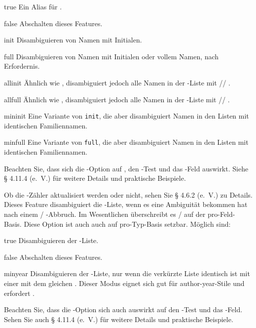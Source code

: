 \documentclass{ltxdockit}[2011/03/25]
\begin{document}
\begin{optionlist}
\begin{valuelist} 
\item[true] Ein Alias für .  
\item[false] Abschalten dieses Features.  
\item[init] Disambiguieren von Namen mit Initialen.  
\item[full] Disambiguieren von Namen mit Initialen oder vollem Namen, nach
Erfordernis.  
\item[allinit] Ähnlich wie , disambiguiert jedoch alle Namen in
der -Liste mit \slash {}\slash 
{}.
\item[allfull] Ähnlich wie , disambiguiert jedoch alle Namen in
der -Liste mit \slash {}\slash
{}.  
\item[mininit] Eine Variante von \texttt{init}, die aber disambiguiert
Namen in den Listen mit identischen Familiennamen. 
\item[minfull] Eine Variante von \texttt{full}, die aber disambiguiert
Namen in den Listen mit identischen Familiennamen.  
\end{valuelist}
%
Beachten Sie, dass sich die -Option auf
, den -Test und das
-Feld auswirkt. Siehe § 4.11.4 (e.~V.) %
für weitere Details und praktische Beispiele.



Ob die -Zähler aktualisiert werden oder nicht, sehen Sie 
§ 4.6.2 (e.~V.) %
zu Details. Dieses Feature disambiguiert die -Liste,
wenn es eine Ambiguität bekommen hat nach einem \slash
{}-Abbruch. Im Wesentlichen überschreibt es
\slash {} auf der pro-Feld-Basis. Diese Option
ist auch auch auf pro-Typ-Basis setzbar. Möglich sind: 

\begin{valuelist} 
\item[true] Disambiguieren der -Liste.
\item[false] Abschalten dieses Features.  
\item[minyear] Disambiguieren der -Liste, nur wenn die
verkürzte Liste identisch ist mit einer mit dem gleichen
. Dieser Modus eignet sich gut für author-year-Stile
und erfordert .  
\end{valuelist}
%
Beachten Sie, dass die -Option sich auch auswirkt auf den 
-Test und das -Feld. Sehen Sie auch
§ 4.11.4 (e.~V.) %
für weitere Details und praktische Beispiele. 


\end{optionlist}
\end{document}
